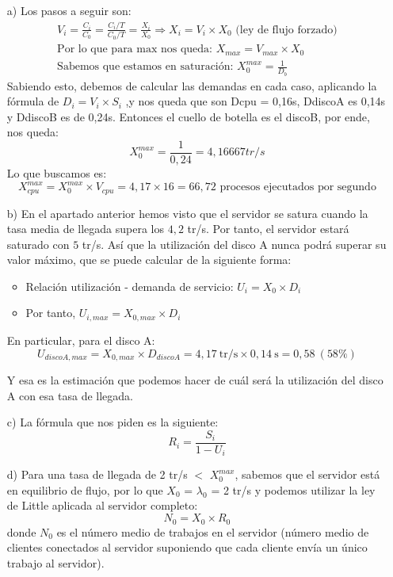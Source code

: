 \documentclass[a4paper,12pt]{article}
\begin{document}
\begin{itemize}
    \item[a)] Los pasos a seguir son:
    \begin{align*}
        V_i = \frac{C_i}{C_0} = \frac{C_i/T}{C_0/T} = \frac{X_i}{X_0} \Rightarrow X_i = V_i \times X_0 \text{ (ley de flujo forzado)} \\
        \text{Por lo que para max nos queda: } X_{max} = V_{max} \times X_0 \\
        \text{Sabemos que estamos en saturación: } X_0^{max} = \frac{1}{D_b}
    \end{align*}
    Sabiendo esto, debemos de calcular las demandas en cada caso, aplicando la fórmula de $D_i = V_i \times S_i$ ,y nos queda que son Dcpu = 0,16s, DdiscoA es 0,14s y DdiscoB es de 0,24s. Entonces el cuello de botella es el discoB, por ende, nos queda:
    $$
    X_0^{max} = \frac{1}{0,24} = 4,16667 tr/s
    $$
    Lo que buscamos es:
    $$
    X_{cpu}^{max} = X_0^{max} \times V_{cpu} = 4,17 \times 16 = 66,72 \text{ procesos ejecutados por segundo}
    $$



    \item [b)] 
    En el apartado anterior hemos visto que el servidor se satura cuando la tasa media de llegada supera los $4,2$ tr/s. Por tanto, el servidor estará saturado con $5$ tr/s. Así que la utilización del disco A nunca podrá superar su valor máximo, que se puede calcular de la siguiente forma:
    
    \begin{itemize}
        \item Relación utilización - demanda de servicio: $U_i = X_0 \times D_i$
        \item Por tanto, $U_{i,max} = X_{0,max} \times D_i$
    \end{itemize}
    
    En particular, para el disco A:
    \[
    U_{discoA,max} = X_{0,max} \times D_{discoA} = 4,17~\text{tr/s} \times 0,14~\text{s} = 0,58~(58\%)
    \]
    
    Y esa es la estimación que podemos hacer de cuál será la utilización del disco A con esa tasa de llegada.


    \item [c)] La fórmula que nos piden es la siguiente:
    $$
    R_i = \frac{S_i}{1-U_i}
    $$

    \item [d)]
    Para una tasa de llegada de 2 tr/s $<$ $X_0^{max}$, sabemos que el servidor está en equilibrio de flujo, por lo que $X_0$ = $\lambda_0$ = 2 tr/s y podemos utilizar la ley de Little aplicada al servidor completo:
    \[
    N_0 = X_0 \times R_0
    \]
    donde $N_0$ es el número medio de trabajos en el servidor (número medio de clientes conectados al servidor suponiendo que cada cliente envía un único trabajo al servidor).


\end{itemize}
\end{document}
